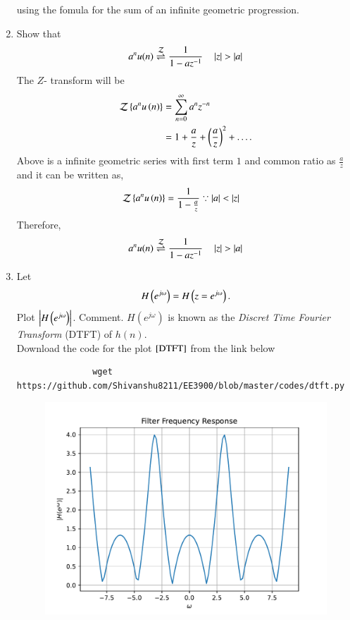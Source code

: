 \documentclass[journal,12pt,twocolumn]{IEEEtran}
\renewcommand\thesection{\arabic{section}}
\begin{document}
\begin{enumerate}[label=\thesection.\arabic*]
           using the fomula for the sum of an infinite geometric progression.
     \item Show that
           \begin{equation}
                \label{eq:anun}
                a^nu(n) \overset{\mathcal{Z}}{ \rightleftharpoons} \frac{1}{1-az^{-1}} \quad \left\vert z\right\vert > \left\vert a\right\vert
           \end{equation}
           \solution
           The $Z$- transform will be
           \begin{align}
                \mathcal{Z}\left\{a^nu\left(n\right)\right\} & = \sum_{n = 0}^{\infty}a^{n}z^{-n}                    \\
                                                & = 1 + \frac{a}{z} + \left(\frac{a}{z}\right)^2 + .\,.\,.\,.
           \end{align}
           Above is a infinite geometric series with first term $1$ and common ratio as $\frac{a}{z}$ and it can
           be written as,
           \begin{align}
                \mathcal{Z}\left\{a^nu\left(n\right)\right\} & = \frac{1}{1 - \frac{a}{z}} \because \left\vert a\right\vert < \left\vert z\right\vert
           \end{align}
           Therefore,
           \begin{equation}
                a^nu(n) \overset{\mathcal{Z}}{ \rightleftharpoons} \frac{1}{1-az^{-1}} \quad \left\vert z\right\vert > \left\vert a\right\vert
           \end{equation}
     \item
           Let
           \begin{equation}
                H\left(e^{j \omega}\right) = H\left(z = e^{j \omega}\right).
           \end{equation}
           Plot $\left\vert H\left(e^{j \omega}\right)\right\vert$.  Comment.  $H(e^{j \omega})$ is known as the {\em Discret Time Fourier Transform} (DTFT) of $h(n)$.\\
           \solution
           Download the code for the plot $\ref{DTFT}$ from the link below
           \begin{lstlisting}
               wget https://github.com/Shivanshu8211/EE3900/blob/master/codes/dtft.py
               \end{lstlisting}
           \begin{figure}[!ht]
                \centering
                \includegraphics[width=\columnwidth]{./figs/dtft}

\end{figure}
\end{enumerate}
\end{document}
